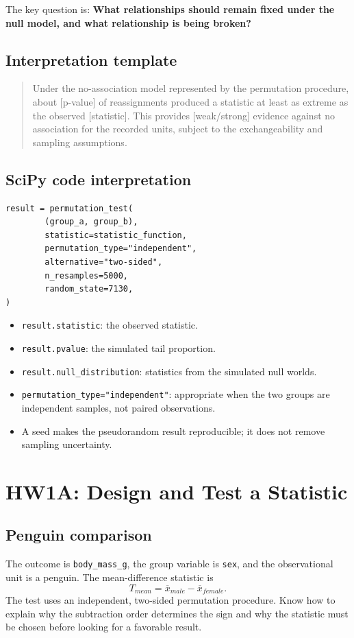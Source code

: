 \documentclass[11pt]{article}
\begin{document}
The key question is: \textbf{What relationships should remain fixed under the null model, and what relationship is being broken?}

\subsection{Interpretation template}
\begin{quote}
Under the no-association model represented by the permutation procedure, about [p-value] of reassignments produced a statistic at least as extreme as the observed [statistic]. This provides [weak/strong] evidence against no association for the recorded units, subject to the exchangeability and sampling assumptions.
\end{quote}

\subsection{SciPy code interpretation}
\begin{lstlisting}
result = permutation_test(
		(group_a, group_b),
		statistic=statistic_function,
		permutation_type="independent",
		alternative="two-sided",
		n_resamples=5000,
		random_state=7130,
)
\end{lstlisting}
\begin{itemize}
	\item \texttt{result.statistic}: the observed statistic.
	\item \texttt{result.pvalue}: the simulated tail proportion.
	\item \texttt{result.null\_distribution}: statistics from the simulated null worlds.
	\item \texttt{permutation\_type="independent"}: appropriate when the two groups are independent samples, not paired observations.
	\item A seed makes the pseudorandom result reproducible; it does not remove sampling uncertainty.
\end{itemize}

\section{HW1A: Design and Test a Statistic}
\subsection{Penguin comparison}
The outcome is \texttt{body\_mass\_g}, the group variable is \texttt{sex}, and the observational unit is a penguin. The mean-difference statistic is
\[
T_{mean} = \overline{x}_{male} - \overline{x}_{female}.
\]
The test uses an independent, two-sided permutation procedure. Know how to explain why the subtraction order determines the sign and why the statistic must be chosen before looking for a favorable result.
\end{document}
